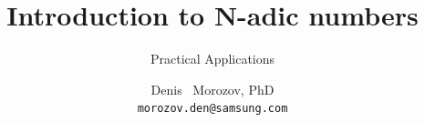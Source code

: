 %
%


{

}


\usepackage[english]{babel}



\usepackage{times}
\usepackage[T1]{fontenc}
\usepackage{graphicx} %
\usepackage{tikz}

\usepackage{verbatim}
\usetikzlibrary{arrows,shapes}

\title[Introduction to N-adic numbers] %
{Introduction to N-adic numbers}

\subtitle
{Practical Applications}


\author[Denis Morozov, PhD \ Samsung R\&D] %
{Denis~ Morozov, PhD  \\  \texttt{morozov.den@samsung.com}}

